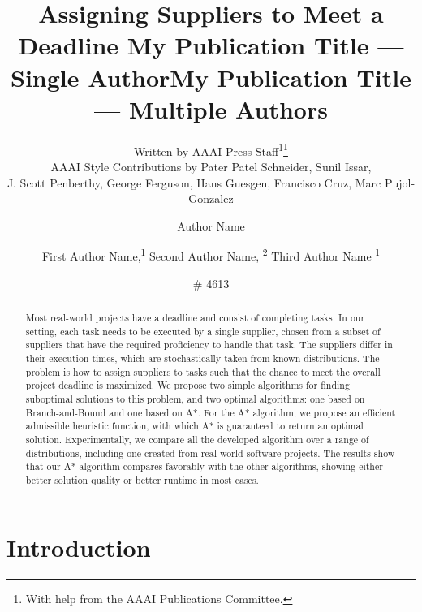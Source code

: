 \documentclass[letterpaper]{article} %
\title{Assigning Suppliers to Meet a Deadline }
\author{
    Written by AAAI Press Staff\textsuperscript{\rm 1}\thanks{With help from the AAAI Publications Committee.}\\
    AAAI Style Contributions by Pater Patel Schneider,
    Sunil Issar,  \\
    J. Scott Penberthy,
    George Ferguson,
    Hans Guesgen,
    Francisco Cruz,
    Marc Pujol-Gonzalez
    \\
}
\title{My Publication Title --- Single Author}
\author {
    Author Name \\
}
\title{My Publication Title --- Multiple Authors}
\author {

        First Author Name,\textsuperscript{\rm 1}
        Second Author Name, \textsuperscript{\rm 2}
        Third Author Name \textsuperscript{\rm 1} \\
}
\author {\# 4613}
\newcommand{\astar}{\textsc{A*}\xspace}
\begin{document}
\linenumbers

\maketitle


\begin{abstract}
Most real-world projects have a deadline and consist of completing tasks. 
In our setting, each task needs to be executed by a single supplier, chosen from a subset of suppliers that have the required proficiency to handle that task. The suppliers differ in their execution times, which are stochastically taken from known distributions. The problem is how to assign suppliers to tasks such that the chance to meet the overall project deadline is maximized. 
We propose two simple algorithms for finding suboptimal solutions to this problem, and two optimal algorithms: one based on Branch-and-Bound and one based on \astar. For the \astar algorithm, we propose an efficient admissible heuristic function, with which \astar is guaranteed to return an optimal solution. 
Experimentally, we compare all the developed algorithm over a range of distributions, including one created from real-world software projects. The results show that our \astar algorithm compares favorably with the other algorithms, showing either better solution quality or better runtime in most cases. 

\end{abstract}

\section{Introduction}         
\end{document}
